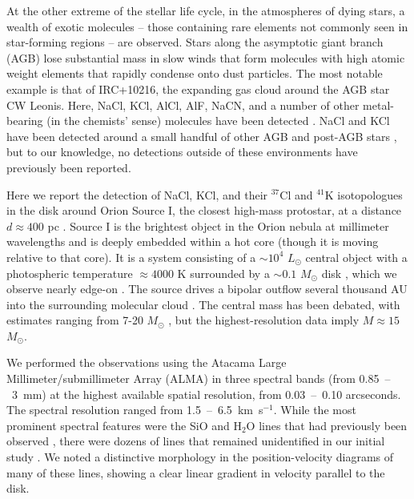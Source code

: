 \documentclass[12pt]{article}
\newcommand{\msun}{\ensuremath{M_{\odot}}\xspace}			%
\newcommand{\lsun}{\ensuremath{L_{\odot}}\xspace}			%
\newcommand{\water}{H$_{2}$O\xspace}		%
\newcommand{\kms}{\textrm{km~s}\ensuremath{^{-1}}\xspace}	%
\begin{document}
At the other extreme of the stellar life cycle, in the atmospheres of dying
stars, a wealth of exotic molecules -- those containing rare elements not
commonly seen in star-forming regions -- are observed.  Stars along the
asymptotic giant branch (AGB) lose substantial mass in slow winds
\cite{Herwig2005a} that form molecules with high atomic weight elements that
rapidly condense onto dust particles.  The most notable example is that of
IRC+10216, the expanding gas cloud around the AGB star CW Leonis.  Here, NaCl,
KCl, AlCl, AlF, NaCN, and a number of other metal-bearing (in the chemists'
sense) molecules have been detected \cite{Agundez2012a,Zack2011a}.  NaCl and
KCl have been detected around a small handful of other AGB and post-AGB stars
\cite{Milam2007a,Highberger2003a,Sanchez-Contreras2018a}, but to our knowledge,
no detections outside of these environments have previously been reported.

Here we report the detection of NaCl, KCl, and their $^{37}$Cl and $^{41}$K
isotopologues in the disk around Orion Source I, the closest high-mass
protostar, at a distance $d\approx400$ pc \cite{Grossschedl2018a}.   Source I
is the brightest object in the Orion nebula at millimeter wavelengths and is
deeply embedded within a hot core (though it is moving relative to that core).
It is a system consisting of a $\sim10^4$ \lsun central object with a
photospheric temperature $\approx4000$ K \cite{Testi2010a} surrounded by a
$\sim0.1$ \msun disk \cite{Plambeck2016a}, which we observe nearly edge-on
\cite{Matthews2010a}.  The source drives a bipolar outflow several thousand AU
into the surrounding molecular cloud \cite{Plambeck2009}. The central mass has
been debated, with estimates ranging from 7-20 \msun
\cite{Matthews2010a,Plambeck2016a}, but the highest-resolution data imply
$M\approx15$ \msun  \cite{Ginsburg2018b}.

We performed the observations using the Atacama Large Millimeter/submillimeter
Array (ALMA) in three spectral bands (from 0.85~--~3~mm) at the highest
available spatial resolution, from 0.03~--~0.10 arcseconds. The spectral
resolution ranged from 1.5~--~6.5~\kms.  While the most prominent spectral
features were the SiO and \water lines that had previously been observed
\cite{Goddi2009a,Niederhofer2012a,Greenhill2013a,Hirota2014a}, there were
dozens of lines that remained unidentified in our initial study
\cite{Ginsburg2018b}.  We noted a distinctive morphology in the
position-velocity diagrams of many of these lines, showing a clear linear
gradient in velocity parallel to the disk. 
\end{document}
